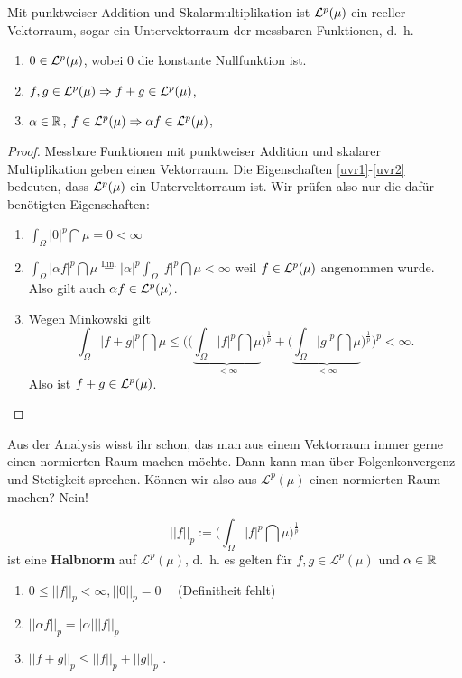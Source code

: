 \begin{lemma}
	Mit punktweiser Addition und Skalarmultiplikation ist $\mathcal{L}^p(\mu)$ ein reeller Vektorraum, sogar ein Untervektorraum der messbaren Funktionen, \mbox{d. h.} 
	\begin{enumerate}[label=(\roman*)]
		\item\label{uvr2} $0 \in \mathcal{L}^p(\mu)$, wobei $0$ die konstante Nullfunktion ist.
		\item\label{uvr1} $f,g \in \mathcal{L}^p(\mu) \Rightarrow f+g \in \mathcal{L}^p(\mu)$,
		\item $\alpha \in \mathbb{R}$, $f \in \mathcal{L}^p(\mu) \Rightarrow \alpha f \in \mathcal{L}^p(\mu)$,
	\end{enumerate}
\end{lemma}

\begin{proof}
	Messbare Funktionen mit punktweiser Addition und skalarer Multiplikation geben einen Vektorraum. Die Eigenschaften \ref{uvr1}-\ref{uvr2} bedeuten, dass $\mathcal{L}^p(\mu)$ ein Untervektorraum ist. Wir prüfen also nur die dafür benötigten Eigenschaften:
	\begin{enumerate}[label=(\roman*)]
		\item $\int_{\Omega} |0|^p \dint \mu = 0<\infty$
		\item $\int_{\Omega} |\alpha f|^p \dint \mu \overset{\text{Lin.}}{=} |\alpha|^p \int_{\Omega} |f|^p \dint \mu < \infty$ weil $f \in \mathcal{L}^p(\mu)$ angenommen wurde. Also gilt auch $\alpha f \in \mathcal{L}^p(\mu)$.
		\item Wegen Minkowski gilt
		\[ \int_{\Omega} |f+g|^p \dint \mu \leq \Bigg( \Big( \underbrace{\int_{\Omega} |f|^p \dint \mu}_{< \infty} \Big)^{\frac{1}{p}} + \Big( \underbrace{\int_{\Omega} |g|^p \dint \mu}_{< \infty} \Big)^{\frac{1}{p}} \Bigg)^p < \infty. \]
		Also ist $f+g \in \mathcal{L}^p(\mu)$.
	\end{enumerate}
\end{proof}
Aus der Analysis wisst ihr schon, das man aus einem Vektorraum immer gerne einen normierten Raum machen m\"ochte. Dann kann man \"uber Folgenkonvergenz und Stetigkeit sprechen. K\"onnen wir also aus $\mathcal L^p(\mu)$ einen normierten Raum machen? Nein!
\begin{lemma}
	\[ ||f||_p := \Big( \int_{\Omega} |f|^p \dint \mu \Big)^{\frac{1}{p}} \] ist eine \textbf{Halbnorm} auf $\mathcal L^p(\mu)$, \mbox{d. h.} es gelten f\"ur $f,g\in \mathcal L^p(\mu)$ und $\alpha\in \mathbb{R}$
	\begin{enumerate}[label=(\roman*)]
		\item $0 \leq ||f||_p < \infty, ||0||_p=0\quad$ (Definitheit fehlt)
		\item $ ||\alpha f ||_p = | \alpha | ||f||_p$
		\item $|| f + g ||_p \leq ||f||_p + ||g||_p$ .
	\end{enumerate}
\end{lemma}

